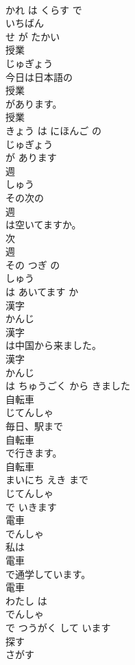 \documentclass[8pt]{extreport}
\begin{document}
\begin{CJK}{UTF8}{min}
\\	かれ は くらす で 
\\	いちばん
\\	せ が たかい	
\\	授業	
\\	じゅぎょう	
\\	今日は日本語の
\\	授業
\\	があります。	
\\	授業 
\\	きょう は にほんご の 
\\	じゅぎょう
\\	が あります	
\\	週	
\\	しゅう	
\\	その次の
\\	週
\\	は空いてますか。	
\\	次 
\\	週 
\\	その つぎ の 
\\	しゅう
\\	は あいてます か	
\\	漢字	
\\	かんじ	
\\	漢字
\\	は中国から来ました。	
\\	漢字 
\\	かんじ
\\	は ちゅうごく から きました	
\\	自転車	
\\	じてんしゃ	
\\	毎日、駅まで
\\	自転車
\\	で行きます。	
\\	自転車 
\\	まいにち えき まで 
\\	じてんしゃ
\\	で いきます	
\\	電車	
\\	でんしゃ	
\\	私は
\\	電車
\\	で通学しています。	
\\	電車 
\\	わたし は 
\\	でんしゃ
\\	で つうがく して います	
\\	探す	
\\	さがす	

\end{CJK}
\end{document}
